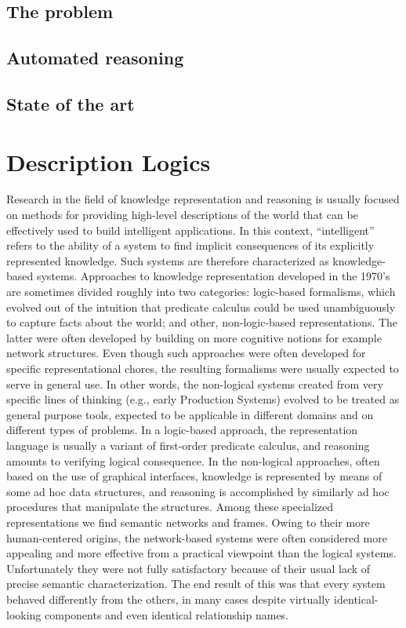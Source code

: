 \documentclass[a4paper, 11pt, oneside]{elsarticle}
\begin{document}
\section{The problem}
\section{Automated reasoning}
\section{State of the art}



\chapter{Description Logics}

Research in the field of knowledge representation and reasoning is usually focused on methods for providing high-level descriptions of the world that can be effectively used to build intelligent applications.
In this context, “intelligent” refers to the ability of a system to find implicit consequences of its explicitly represented knowledge.
Such systems are therefore characterized as knowledge-based systems.
Approaches to knowledge representation developed in the 1970’s are sometimes divided roughly into two categories: logic-based formalisms, which evolved out of the intuition that predicate calculus could be used unambiguously to capture facts about the world; and other, non-logic-based representations.
The latter were often developed by building on more cognitive notions for example network structures.
Even though such approaches were often developed for specific representational chores, the resulting formalisms were usually expected to serve in general use.
In other words, the non-logical systems created from very specific lines of thinking (e.g., early Production Systems) evolved to be treated as general purpose tools, expected to be applicable in different domains and on different types of problems.
In a logic-based approach, the representation language is usually a variant of first-order predicate calculus, and reasoning amounts to verifying logical consequence.
In the non-logical approaches, often based on the use of graphical interfaces, knowledge is represented by means of some ad hoc data structures, and reasoning is accomplished by similarly ad hoc procedures that manipulate the structures.
Among these specialized representations we find semantic networks and frames. Owing to their more human-centered origins, the network-based systems were often considered more appealing and more effective from a practical viewpoint than the logical systems.
Unfortunately they were not fully satisfactory because of their usual lack of precise semantic characterization.
The end result of this was that every system behaved differently from the others, in many cases despite virtually identical-looking components and even identical relationship names.
\end{document}
